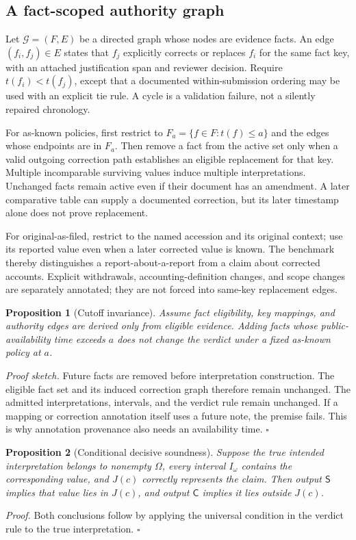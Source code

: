 \documentclass[11pt,a4paper]{article}
\newcommand{\pbreak}{\clearpage}
\newcommand{\Slabel}{\mathsf{S}}
\newcommand{\Clabel}{\mathsf{C}}
\newtheorem{proposition}{Proposition}
\begin{document}
\pbreak
\subsection{A fact-scoped authority graph}
Let $\mathcal G=(F,E)$ be a directed graph whose nodes are evidence facts. An edge $(f_i,f_j)\in E$ states that $f_j$ explicitly corrects or replaces $f_i$ for the same fact key, with an attached justification span and reviewer decision. Require $t(f_i)<t(f_j)$, except that a documented within-submission ordering may be used with an explicit tie rule. A cycle is a validation failure, not a silently repaired chronology.

For as-known policies, first restrict to $F_a=\{f\in F:t(f)\le a\}$ and the edges whose endpoints are in $F_a$. Then remove a fact from the active set only when a valid outgoing correction path establishes an eligible replacement for that key. Multiple incomparable surviving values induce multiple interpretations. Unchanged facts remain active even if their document has an amendment. A later comparative table can supply a documented correction, but its later timestamp alone does not prove replacement.

For original-as-filed, restrict to the named accession and its original context; use its reported value even when a later corrected value is known. The benchmark thereby distinguishes a report-about-a-report from a claim about corrected accounts. Explicit withdrawals, accounting-definition changes, and scope changes are separately annotated; they are not forced into same-key replacement edges.

\begin{proposition}[Cutoff invariance]
Assume fact eligibility, key mappings, and authority edges are derived only from eligible evidence. Adding facts whose public-availability time exceeds $a$ does not change the verdict under a fixed as-known policy at $a$.
\end{proposition}
\emph{Proof sketch.} Future facts are removed before interpretation construction. The eligible fact set and its induced correction graph therefore remain unchanged. The admitted interpretations, intervals, and the verdict rule remain unchanged. If a mapping or correction annotation itself uses a future note, the premise fails. This is why annotation provenance also needs an availability time. $\square$

\begin{proposition}[Conditional decisive soundness]
Suppose the true intended interpretation belongs to nonempty $\Omega$, every interval $I_\omega$ contains the corresponding value, and $J(c)$ correctly represents the claim. Then output $\Slabel$ implies that value lies in $J(c)$, and output $\Clabel$ implies it lies outside $J(c)$.
\end{proposition}
\emph{Proof.} Both conclusions follow by applying the universal condition in the verdict rule to the true interpretation. $\square$
\end{document}
